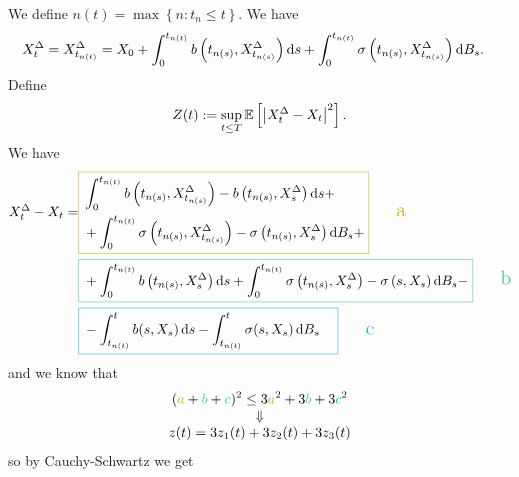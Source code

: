 \documentclass[12pt]{report}
\begin{document}
\begin{fancyproof}
	We define $n(t)=\max\left\{n:t_{n}\leq t\right\}$. We have
	\begin{align*}
		X_{t}^{\Delta}&=X^{\Delta}_{t_{n(t)}}=X_{0}+\int_{0}^{t_{n(t)}}b\left(t_{n(s)},X^{\Delta}_{t_{n(s)}}\right)\mathop{}\!\mathrm{d} s+\int_{0}^{t_{n(t)}}\sigma\left(t_{n(s)},X^{\Delta}_{t_{n(s)}}\right)\mathop{}\!\mathrm{d} B_s.
	\end{align*}
	Define
	\begin{equation*}
		Z(t):=\sup_{t\leq T}\mathbb{E}\left[\left|X^{\Delta}_{t}-X_{t}\right|^{2}\right].
	\end{equation*}
	We have
	\begin{align*}
		X^{\Delta}_{t}-X_{t}=&\color{Gold3}\boxed{\color{black}\begin{aligned}
				&\int_{0}^{t_{n(t)}}b\left(t_{n(s)},X^{\Delta}_{t_{n(s)}}\right)-b\left(t_{n(s)},X^{\Delta}_{s}\right)\ds+\\
		&+\int_{0}^{t_{n(t)}}\sigma\left(t_{n(s)},X^{\Delta}_{t_{n(s)}}\right)-\sigma\left(t_{n(s)},X^{\Delta}_{s}\right)\dif B_s+\\
		\end{aligned}}\tag*{\Large \color{Gold3}a}\\
	&\color{SeaGreen3}\boxed{\color{black}\begin{aligned}
				&+\int_{0}^{t_{n(t)}}b\left(t_{n(s)},X^{\Delta}_{s}\right)\ds+\int_{0}^{t_{n(t)}}\sigma\left(t_{n(s)},X^{\Delta}_{s}\right)-\sigma\left(s,X_s\right)\dif B_s-\\
		\end{aligned}}\tag*{\Large \color{SeaGreen3}b}\\
		&\color{Turquoise3}\boxed{\color{black}\begin{aligned}
				&-\int_{t_{n(t)}}^{t}b(s,X_s)\ds-\int_{t_{n(t)}}^{t}\sigma(s,X_s)\dif B_s
		\end{aligned}}\tag*{\Large \color{Turquoise3}c}
	\end{align*}
	and we know that 
	\begin{equation*}
		\begin{array}{>{\displaystyle}c}
			(\textcolor{Gold3}{a}+\textcolor{SeaGreen3}{b}+\textcolor{Turquoise3}{c})^{2}\leq3\textcolor{Gold3}{a}^{2}+3\textcolor{SeaGreen3}{b}+3\textcolor{Turquoise3}{c}^{2}\\
			\Downarrow\\
			z(t)=3z_1(t)+3z_2(t)+3z_3(t)
		\end{array}
	\end{equation*}
	so by Cauchy-Schwartz we get
	\begin{align*}

\end{align*}
\end{fancyproof}
\end{document}
